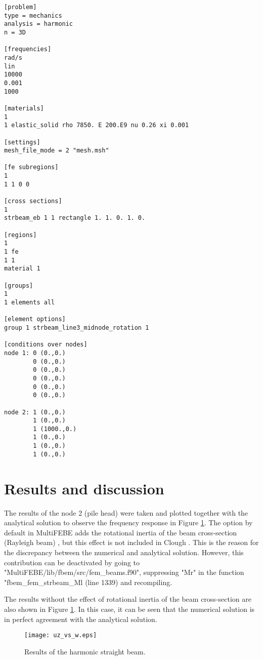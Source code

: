 \documentclass[a4]{article}
\begin{document}
\begin{Verbatim}
[problem]
type = mechanics
analysis = harmonic
n = 3D

[frequencies]
rad/s
lin
10000
0.001
1000

[materials]
1
1 elastic_solid rho 7850. E 200.E9 nu 0.26 xi 0.001

[settings]
mesh_file_mode = 2 "mesh.msh"

[fe subregions]
1
1 1 0 0

[cross sections]
1
strbeam_eb 1 1 rectangle 1. 1. 0. 1. 0.

[regions]
1
1 fe
1 1
material 1

[groups]
1
1 elements all

[element options]
group 1 strbeam_line3_midnode_rotation 1

[conditions over nodes]
node 1: 0 (0.,0.)
        0 (0.,0.)
        0 (0.,0.)
        0 (0.,0.)
        0 (0.,0.)
        0 (0.,0.)

node 2: 1 (0.,0.)
        1 (0.,0.)
        1 (1000.,0.)
        1 (0.,0.)
        1 (0.,0.)
        1 (0.,0.)
\end{Verbatim}

\section{Results and discussion}

The results of the node 2 (pile head) were taken and plotted together with the analytical solution to observe the frequency response in Figure \ref{fig:beam_results}. The option by default in MultiFEBE adds the rotational inertia of the beam cross-section (Rayleigh beam) \cite{han}, but this effect is not included in Clough \cite{clough}. This is the reason for the discrepancy between the numerical and analytical solution. However, this contribution can be deactivated by going to "MultiFEBE/lib/fbem/src/fem\_beams.f90", suppressing "Mr" in the function "fbem\_fem\_strbeam\_Ml (line 1339) and recompiling.

The results without the effect of rotational inertia of the beam cross-section are also shown in Figure \ref{fig:beam_results}. In this case, it can be seen that the numerical solution is in perfect agreement with the analytical solution.

\begin{figure}[h]
	\centering
	\texttt{[image: uz\_vs\_w.eps]}
	\caption{Results of the harmonic straight beam.}
	\label{fig:beam_results}
\end{figure}
\end{document}
